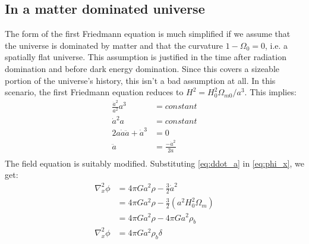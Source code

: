 \documentclass[12pt,a4paper,twoside]{book}
\begin{document}
		\subsection{In a matter dominated universe}
			The form of the first Friedmann equation is much simplified if we assume that the universe is dominated by matter and that the curvature $1-\Omega_0=0$, i.e. a spatially flat universe. This assumption is justified in the time after radiation domination and before dark energy domination. Since this covers a sizeable portion of the universe's history, this isn't a bad assumption at all. In this scenario, the first Friedmann equation reduces to $H^2=H_0^2\Omega_{m0}/{a^3}$. This implies:
			\begin{equation}
				\begin{aligned}
					\frac{\dot{a}^2}{a^2}a^3&=constant\\
					\dot{a}^2a&=constant\\
					2a\dot{a}\ddot{a}+\dot{a}^3&=0\\
					\ddot{a}&=\frac{-\dot{a}^2}{2a}\\
				\end{aligned}
				\label{eq:ddot_a}
			\end{equation}
			The field equation is suitably modified. Substituting \ref{eq:ddot_a} in \ref{eq:phi_x}, we get:
			\begin{equation}
				\begin{aligned}
					\nabla_x^2\phi&=4\pi G a^2\rho -\frac{3}{2}\dot{a}^2\\
											   &=4\pi G a^2\rho- \frac{3}{2}\left(a^2H_0^2\Omega_m\right)\\
												&=4\pi Ga^2\rho-4\pi Ga^2\rho_b\\
					\nabla_x^2\phi&=4\pi G a^2\rho_b\delta\\
				\end{aligned}
				\label{eq:perturb-poisson}
			\end{equation}
\end{document}
